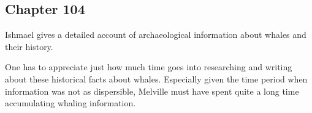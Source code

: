 \subsection{Chapter 104}

Ishmael gives a detailed account of archaeological information about whales and
their history.

One has to appreciate just how much time goes into researching and writing
about these historical facts about whales. Especially given the time period
when information was not as dispersible, Melville must have spent quite a long
time accumulating whaling information.

